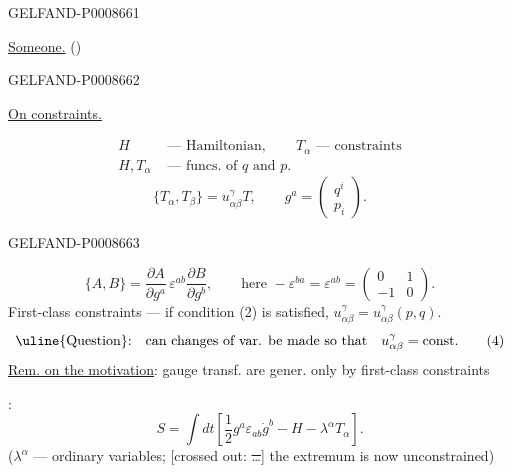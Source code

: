 \begin{GelfandAdjacentEvidence}{GELFAND-P000866}{1}
 \qquad {}

\uline{Someone.} ()
\end{GelfandAdjacentEvidence}
\begin{GelfandAdjacentEvidence}{GELFAND-P000866}{2}


\uline{On constraints.}

\[
\begin{aligned}
H&\text{ — Hamiltonian},\qquad T_\alpha\text{ — constraints}\\
H,T_\alpha&\text{ — funcs. of }q\text{ and }p.
\end{aligned}\tag{1}
\]
\[
\{T_\alpha,T_\beta\}=u_{\alpha\beta}^{\gamma}T,\qquad
g^a=\begin{pmatrix}q^i\\p_i\end{pmatrix}.\tag{2}
\]
\end{GelfandAdjacentEvidence}
\begin{GelfandAdjacentEvidence}{GELFAND-P000866}{3}

\[
\{A,B\}=\frac{\partial A}{\partial g^a}\,\varepsilon^{ab}
\frac{\partial B}{\partial g^b},\qquad
\text{here }-\varepsilon^{ba}=\varepsilon^{ab}
=\begin{pmatrix}0&1\\-1&0\end{pmatrix}.\tag{3}
\]
First-class constraints — if condition (2) is satisfied, \quad
\(u_{\alpha\beta}^{\gamma}=u_{\alpha\beta}^{\gamma}(p,q)\).
\[
\text{\uline{Question}:}\quad
\text{can changes of var. be made so that}\quad u_{\alpha\beta}^{\gamma}=\mathrm{const}.\tag{4}
\]
\uline{Rem. on the motivation}: gauge transf. are gener. only by first-class constraints

:
\[
S=\int dt\left[\frac12 g^a\varepsilon_{ab}\dot g^b-H-\lambda^\alpha T_\alpha\right].\tag{5}
\]
(\(\lambda^\alpha\) — ordinary variables;
[crossed out: \sout{…}] the extremum is now unconstrained)
\end{GelfandAdjacentEvidence}
